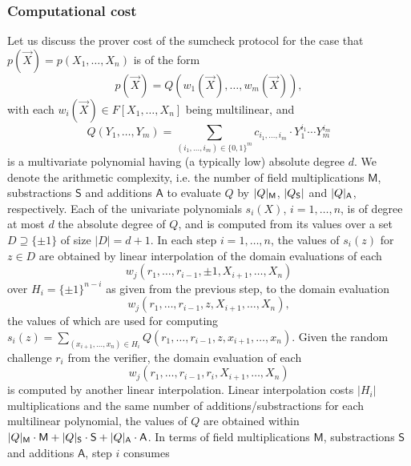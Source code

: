 \documentclass[11pt]{article}
\theoremstyle{definition}
\theoremstyle{definition}
\newtheorem{rem}[thm]{Remark}
\begin{document}
\subsubsection{Computational cost}

Let us discuss the prover cost of the sumcheck protocol for the case that  $p(\vec X) = p(X_1,\ldots, X_n)$ is of the form
\[
p(\vec X) = Q(w_1(\vec X), \ldots, w_m(\vec X)),
\]
with each $w_i(\vec X)\in F[X_1,\ldots, X_n]$ being multilinear, and 
\[
Q(Y_1,\ldots, Y_m) = \sum_{(i_1,\ldots, i_m)\in \{0,1\}^m} c_{i_1,\ldots, i_m} \cdot Y_1^{i_1}\cdots Y_m^{i_m}
\]
 is a multivariate polynomial having (a typically low) absolute degree $d$.
We denote the arithmetic complexity, i.e. the number of field multiplications $\mathsf M$, substractions $\mathsf S$ and additions $\mathsf A$ to evaluate $Q$ by $|Q|_\textsf M$, $|Q_\textsf S|$ and $|Q|_\textsf A$, respectively.
Each of the univariate polynomials $s_i(X)$, $i=1,\ldots, n$, is of degree at most $d$ the absolute degree of $Q$, and is computed from its values over a set $D\supseteq \{\pm 1\}$ of  size $|D| = d + 1$.
In each step $i=1,\ldots, n$, the values of $s_i(z)$ for $z\in D$ are obtained by linear interpolation of the domain evaluations of each
\[
w_j (r_1,\ldots, r_{i-1}, \pm 1, X_{i+1}, \ldots, X_n)
\]
over $H_{i}=\{\pm 1\}^{n-i}$ as given from the previous step, to the domain evaluation
\[
w_j (r_1,\ldots, r_{i-1}, z, X_{i+1}, \ldots, X_n), 
\]
the values of which are used for computing $s_i(z) = \sum_{(x_{i+1},\ldots, x_n)\in H_{i}} Q(r_1,\ldots, r_{i-1}, z, x_{i+1}, \ldots, x_n)$.
Given the random challenge $r_i$ from the verifier, the domain evaluation of each   
\[
w_j(r_1,\ldots, r_{i-1}, r_i, X_{i+1},\ldots, X_n)
\]
is computed by another linear interpolation.
Linear interpolation costs $|H_i|$ multiplications and the same number of additions/substractions for each multilinear polynomial, the values of $Q$ are obtained within $|Q|_\textsf M \cdot \textsf{M} +   |Q|_\textsf S \cdot \textsf S + |Q|_\textsf A \cdot \textsf A$.  
In terms of field multiplications $\mathsf M$, substractions $\mathsf S$ and additions $\mathsf A$, step $i$ consumes 
\end{document}

